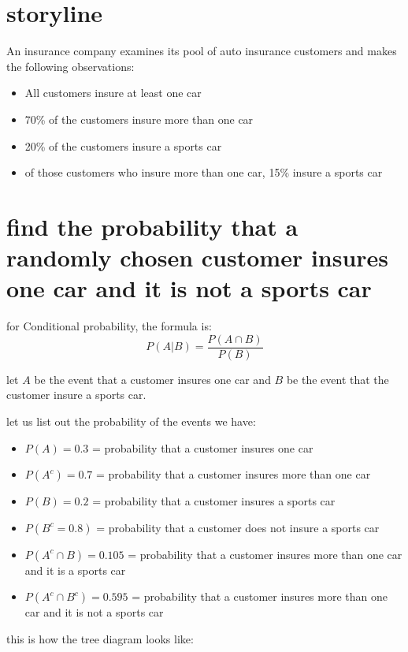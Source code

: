 \documentclass{article}
\begin{document}
\section{storyline}
An insurance company examines its pool of auto insurance customers and makes the following observations:
\begin{itemize}
    \item All customers insure at least one car
    \item 70\% of the customers insure more than one car
    \item 20\% of the customers insure a sports car
    \item of those customers who insure more than one car, 15\% insure a sports car
\end{itemize}

\section{find the probability that a randomly chosen customer insures one car and it is not a sports car}

for Conditional probability, the formula is:
\[P(A|B) = \frac{P(A \cap B)}{P(B)}\]

let \(A\) be the event that a customer insures one car and \(B\) be the event that the customer insure a sports car.

let us list out the probability of the events we have:

\begin{itemize}
    \item \(P(A) = 0.3\) = probability that a customer insures one car
    \item \(P(A^c) = 0.7\) = probability that a customer insures more than one car
    \item \(P(B) = 0.2\) = probability that a customer insures a sports car
    \item \(P(B^c = 0.8)\) = probability that a customer does not insure a sports car
    \item \(P(A^c \cap B) = 0.105\) = probability that a customer insures more than one car and it is a sports car
    \item \(P(A^c \cap B^c ) = 0.595\) = probability that a customer insures more than one car and it is not a sports car
\end{itemize}

this is how the tree diagram looks like:
\end{document}
